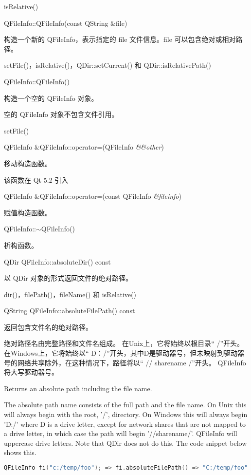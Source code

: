 \begin{seeAlso}
 isRelative()
\end{seeAlso}

QFileInfo::QFileInfo(const QString \&file)

构造一个新的 QFileInfo，表示指定的 file 文件信息。file 可以包含绝对或相对路径。


\begin{seeAlso}
setFile()，isRelative()，QDir::setCurrent() 和
QDir::isRelativePath()
\end{seeAlso}

QFileInfo::QFileInfo()

构造一个空的 QFileInfo 对象。

\begin{notice}
空的 QFileInfo 对象不包含文件引用。
\end{notice}


\begin{seeAlso}
 setFile()
\end{seeAlso}


QFileInfo \&QFileInfo::operator=(QFileInfo \emph{\&\&other})

移动构造函数。

该函数在 Qt 5.2 引入

QFileInfo \&QFileInfo::operator=(const QFileInfo \emph{\&fileinfo})

赋值构造函数。

QFileInfo::$\sim$QFileInfo()

析构函数。

QDir QFileInfo::absoluteDir() const

以 QDir 对象的形式返回文件的绝对路径。


\begin{seeAlso}
dir()，filePath()，fileName() 和 isRelative()
\end{seeAlso}

QString QFileInfo::absoluteFilePath() const

返回包含文件名的绝对路径。

绝对路径名由完整路径和文件名组成。 在Unix上，它将始终以根目录“ /”开头。 
在Windows上，它将始终以“ D：/”开头，其中D是驱动器号，但未映射到驱动器号的网络共享除外，在这种情况下，路径将以“ // sharename /”开头。 QFileInfo 将大写驱动器号。

Returns an absolute path including the file name.

The absolute path name consists of the full path and the file name. On
Unix this will always begin with the root, '/', directory. On Windows
this will always begin 'D:/' where D is a drive letter, except for
network shares that are not mapped to a drive letter, in which case
the path will begin '//sharename/'. QFileInfo will uppercase drive
letters. Note that QDir does not do this. The code snippet below shows
this.

\begin{lstlisting}[language=C++]
QFileInfo fi("c:/temp/foo"); => fi.absoluteFilePath() => "C:/temp/foo"
\end{lstlisting}